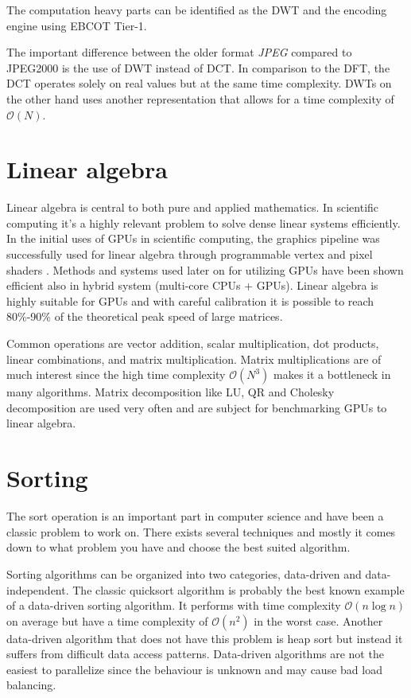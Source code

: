 The computation heavy parts can be identified as the \gls{DWT} and the encoding engine using \gls{EBCOT} Tier-1.

The important difference between the older format \emph{JPEG} compared to JPEG2000 is the use of \gls{DWT} instead of \gls{DCT}. In comparison to the \gls{DFT}, the \gls{DCT} operates solely on real values but at the same time complexity. \gls{DWT}s on the other hand uses another representation that allows for a time complexity of $\mathcal{O}(N)$.

\section{Linear algebra}
Linear algebra is central to both pure and applied mathematics. In scientific computing it's a highly relevant problem to solve dense linear systems efficiently. In the initial uses of GPUs in scientific computing, the graphics pipeline was successfully used for linear algebra through programmable vertex and pixel shaders \cite{kruger2003linear}. Methods and systems used later on for utilizing \gls{GPU}s have been shown efficient also in hybrid system (multi-core \gls{CPU}s + \gls{GPU}s)\cite{tomov2010dense}. Linear algebra is highly suitable for \gls{GPU}s and with careful calibration it is possible to reach 80\%-90\% of the theoretical peak speed of large matrices\cite{volkov2008benchmarking}.

Common operations are vector addition, scalar multiplication, dot products, linear combinations, and matrix multiplication. Matrix multiplications are of much interest since the high time complexity $\mathcal{O}(N^3)$ makes it a bottleneck in many algorithms. Matrix decomposition like LU, QR and Cholesky decomposition are used very often and are subject for benchmarking \gls{GPU}s to linear algebra\cite{volkov2008benchmarking}.

\section{Sorting}
The sort operation is an important part in computer science and have been a classic problem to work on. There exists several techniques and mostly it comes down to what problem you have and choose the best suited algorithm.

Sorting algorithms can be organized into two categories, data-driven and data-independent. The classic quicksort algorithm is probably the best known example of a data-driven sorting algorithm. It performs with time complexity $\mathcal{O}(n\log{n})$ on average but have a time complexity of $\mathcal{O}(n^2)$ in the worst case. Another data-driven algorithm that does not have this problem is heap sort but instead it suffers from difficult data access patterns. Data-driven algorithms are not the easiest to parallelize since the behaviour is unknown and may cause bad load balancing.

